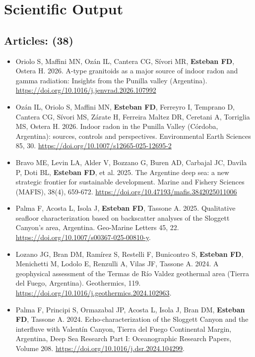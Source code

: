 \documentclass[11pt, a4paper]{article}
\begin{document}
\section{Scientific Output}

\subsection{Articles: (38)}

\begin{itemize}
  \item Oriolo S, Maffini MN, Ozán IL, Cantera CG, Sívori MR, \textbf{Esteban FD}, Ostera H. 2026. A-type granitoids as a major source of indoor radon and gamma radiation: Insights from the Punilla valley (Argentina). \url{https://doi.org/10.1016/j.jenvrad.2026.107992}

  \item Ozán IL, Oriolo S, Maffini MN, \textbf{Esteban FD}, Ferreyro I, Temprano D, Cantera CG, Sívori MS, Zárate H, Ferreira Maltez DR, Ceretani A, Torriglia MS, Ostera H. 2026. Indoor radon in the Punilla Valley (Córdoba, Argentina): sources, controls and perspectives. Environmental Earth Sciences 85, 30. \url{https://doi.org/10.1007/s12665-025-12695-2}

  \item Bravo ME, Levin LA, Alder V, Bozzano G, Buren AD, Carbajal JC, Davila P, Doti BL, \textbf{Esteban FD}, et al. 2025. The Argentine deep sea: a new strategic frontier for sustainable development. Marine and Fishery Sciences (MAFIS), 38(4), 659-672. \url{https://doi.org/10.47193/mafis.3842025011006}

  \item Palma F, Acosta L, Isola J, \textbf{Esteban FD}, Tassone A. 2025. Qualitative seafloor characterization based on backscatter analyses of the Sloggett Canyon’s area, Argentina. Geo-Marine Letters 45, 22. \url{https://doi.org/10.1007/s00367-025-00810-y}.

  \item Lozano JG, Bran DM, Ramírez S, Restelli F, Bunicontro S, \textbf{Esteban FD}, Menichetti M, Lodolo E, Renzulli A, Vilas JF, Tassone A. 2024. A geophysical assessment of the Termas de Río Valdez geothermal area (Tierra del Fuego, Argentina). Geothermics, 119. \url{https://doi.org/10.1016/j.geothermics.2024.102963}.

  \item Palma F, Principi S, Ormazabal JP, Acosta L, Isola J, Bran DM, \textbf{Esteban FD}, Tassone A. 2024. Echo-characterization of the Sloggett Canyon and the interfluve with Valentín Canyon, Tierra del Fuego Continental Margin, Argentina, Deep Sea Research Part I: Oceanographic Research Papers, Volume 208. \url{https://doi.org/10.1016/j.dsr.2024.104299}.


\end{itemize}
\end{document}
